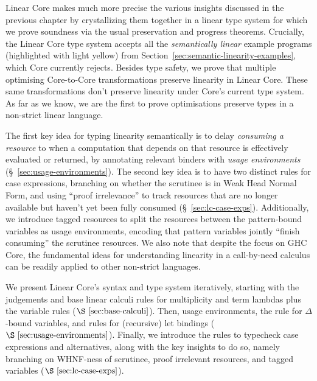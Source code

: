 \documentclass[acmsmall, screen, review]{acmart}
\newcommand{\notyetcolorname}{light yellow}
\begin{document}
Linear Core makes much more precise the various insights discussed in the
previous chapter by crystallizing them together in a linear type system for which we
prove soundness via the usual preservation and progress theorems. Crucially,
the Linear Core type system accepts all the \emph{semantically linear} example
programs (highlighted with \colorbox{notyet}{\notyetcolorname})
from Section~\ref{sec:semantic-linearity-examples}, which Core currently
rejects.
%
Besides type safety, we prove that multiple optimising Core-to-Core
transformations preserve linearity in Linear Core. These same transformations
don't preserve linearity under Core's current type system. As far as we know,
we are the first to prove optimisations preserve types in a non-strict linear
language.

The first key idea for typing linearity semantically is to delay \emph{consuming a
resource} to when a computation that depends on that resource is effectively
evaluated or returned, by annotating relevant binders with \emph{usage
environments} (\S~\ref{sec:usage-environments}).
%
The second key idea is to have two distinct rules for
case expressions, branching on whether the scrutinee is in Weak Head Normal
Form, and using ``proof irrelevance'' to track resources that are no
longer available but haven't yet been fully consumed (\S~\ref{sec:lc-case-exps}). Additionally, we introduce
tagged resources to split the resources between the pattern-bound variables as
usage environments, encoding that pattern variables jointly ``finish
consuming'' the scrutinee resources.
% 
We also note that despite the focus on GHC Core, the fundamental ideas for
understanding linearity in a call-by-need calculus can be readily applied to
other non-strict languages.

We present Linear Core's syntax and type system iteratively, starting with the
judgements and base linear calculi rules for multiplicity and term lambdas plus
the variable rules ($\S~\ref{sec:base-calculi}$).
%
Then, usage environments, the rule for $\Delta$-bound variables, and rules for
(recursive) let bindings ($\S~\ref{sec:usage-environments}$).
%
Finally, we introduce the rules to typecheck case expressions and alternatives,
along with the key insights to do so, namely branching on WHNF-ness of
scrutinee, proof irrelevant resources, and tagged variables
($\S~\ref{sec:lc-case-exps}$).

%
\end{document}
